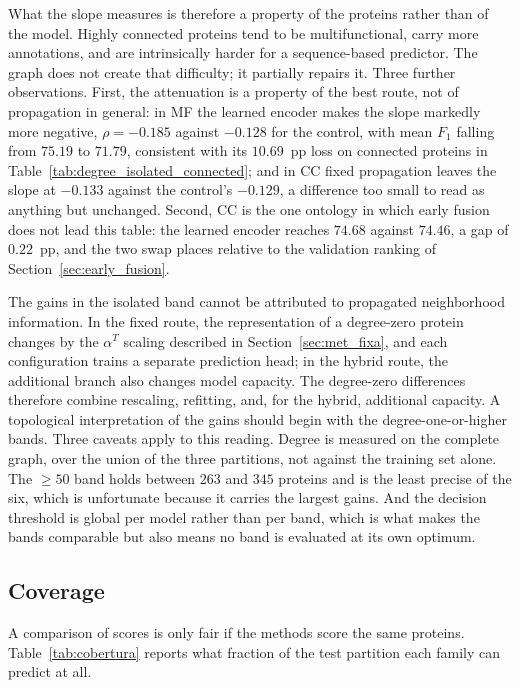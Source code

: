 \documentclass[Ingles]{ic-tese-v3}
\begin{document}
What the slope measures is therefore a property of the proteins rather than of the model.
Highly connected proteins tend to be multifunctional, carry more annotations, and are
intrinsically harder for a sequence-based predictor. The graph does not create that
difficulty; it partially repairs it.
Three further observations. First, the attenuation is a property of the best route, not of
propagation in general: in MF the learned encoder makes the slope markedly more
negative, $\rho = -0.185$ against $-0.128$ for the control, with mean $F_1$ falling from
$75.19$ to $71.79$, consistent with its $10.69$~pp loss on connected proteins in
Table~\ref{tab:degree_isolated_connected}; and in CC fixed propagation leaves the slope at
$-0.133$ against the control's $-0.129$, a difference too small to read as anything but
unchanged. Second, CC is the one ontology in which early fusion does not lead this table:
the learned encoder reaches $74.68$ against $74.46$, a gap of $0.22$~pp, and the two swap
places relative to the validation ranking of Section~\ref{sec:early_fusion}. 

The gains in the isolated band cannot be attributed to propagated neighborhood information. 
In the fixed route, the representation of a degree-zero protein changes by the $\alpha^{T}$ 
scaling described in Section~\ref{sec:met_fixa}, and each configuration trains a separate 
prediction head; in the hybrid route, the additional branch also changes model capacity. 
The degree-zero differences therefore combine rescaling, refitting, and, for the hybrid, 
additional capacity. A topological interpretation of the gains should begin with the 
degree-one-or-higher bands.
Three caveats apply to this reading. Degree is measured on the complete graph, over the
union of the three partitions, not against the training set alone. The $\geq 50$ band holds
between $263$ and $345$ proteins and is the least precise of the six, which is unfortunate
because it carries the largest gains. And the decision threshold is global per model rather
than per band, which is what makes the bands comparable but also means no band is evaluated
at its own optimum.

\subsection{Coverage}
\label{sec:cobertura}

A comparison of scores is only fair if the methods score the same proteins.
Table~\ref{tab:cobertura} reports what fraction of the test partition each family can
predict at all.
\end{document}
